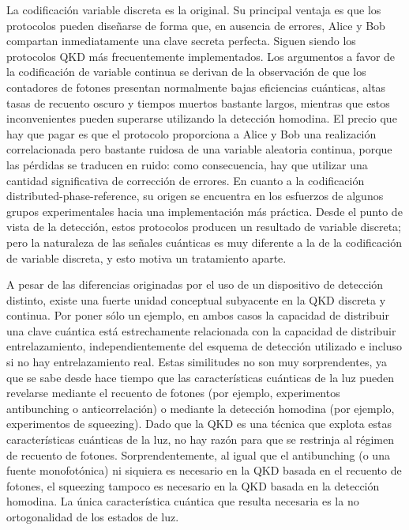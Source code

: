 \documentclass[a4paper,11pt]{book} %
\numberwithin{equation}{chapter}
\begin{document}
La codificación variable discreta es la original. Su principal ventaja es que los protocolos pueden diseñarse de forma que, en ausencia de errores, Alice y Bob compartan inmediatamente una clave secreta perfecta. Siguen siendo los protocolos QKD más frecuentemente implementados. Los argumentos a favor de la codificación de variable continua se derivan de la observación de que los contadores de fotones presentan normalmente bajas eficiencias cuánticas, altas tasas de recuento oscuro y tiempos muertos bastante largos, mientras que estos inconvenientes pueden superarse utilizando la detección homodina. El precio que hay que pagar es que el protocolo proporciona a Alice y Bob una realización correlacionada pero bastante ruidosa de una variable aleatoria continua, porque las pérdidas se traducen en ruido: como consecuencia, hay que utilizar una cantidad significativa de corrección de errores. En cuanto a la codificación distributed-phase-reference, su origen se encuentra en los esfuerzos de algunos grupos experimentales hacia una implementación más práctica. Desde el punto de vista de la detección, estos protocolos producen un resultado de variable discreta; pero la naturaleza de las señales cuánticas es muy diferente a la de la codificación de variable discreta, y esto motiva un tratamiento aparte.

A pesar de las diferencias originadas por el uso de un dispositivo de detección distinto, existe una fuerte unidad conceptual subyacente en la QKD discreta y continua. Por poner sólo un ejemplo, en ambos casos la capacidad de distribuir una clave cuántica está estrechamente relacionada con la capacidad de distribuir entrelazamiento, independientemente del esquema de detección utilizado e incluso si no hay entrelazamiento real. Estas similitudes no son muy sorprendentes, ya que se sabe desde hace tiempo que las características cuánticas de la luz pueden revelarse mediante el recuento de fotones (por ejemplo, experimentos antibunching o anticorrelación) o mediante la detección homodina (por ejemplo, experimentos de squeezing). Dado que la QKD es una técnica que explota estas características cuánticas de la luz, no hay razón para que se restrinja al régimen de recuento de fotones. Sorprendentemente, al igual que el antibunching (o una fuente monofotónica) ni siquiera es necesario en la QKD basada en el recuento de fotones, el squeezing tampoco es necesario en la QKD basada en la detección homodina. La única característica cuántica que resulta necesaria es la no ortogonalidad de los estados de luz.
\end{document}
